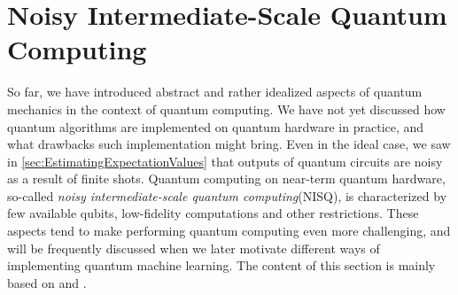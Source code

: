 %

\section{Noisy Intermediate-Scale Quantum Computing}\label{sec:Nisq}
So far, we have introduced abstract and rather idealized aspects of quantum mechanics in the context of quantum computing. We have not yet discussed how quantum algorithms are implemented on quantum hardware in practice, and what drawbacks such implementation might bring. Even in the ideal case, we saw in \cref{sec:EstimatingExpectationValues} that outputs of quantum circuits are noisy as a result of finite shots. Quantum computing on near-term quantum hardware, so-called \emph{noisy intermediate-scale quantum computing}(NISQ)\cite{Preskill_2018}, is characterized by few available qubits, low-fidelity computations and other restrictions. These aspects tend to make performing quantum computing even more challenging, and will be frequently discussed when we later motivate different ways of implementing quantum machine learning. The content of this section is mainly based on \citet{SupervisedwquantumComputers} and \citet{Preskill_2018}.


